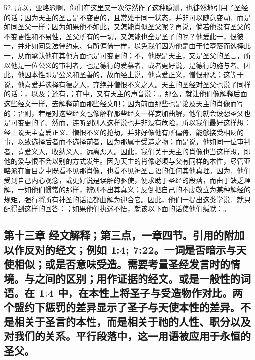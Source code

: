 52. 所以，亚略派啊，你们在这里又一次徒然作了这种臆测，也徒然地引用了圣经的话；因为天主的圣言是不变更的，且常处于同一状态，并非可以随意变动，而是如同圣父一样；因为如果他不如此，又怎能肖似圣父呢？再说，倘若他没有圣父的不变更性和不易性，圣父所有的一切，又怎能也全是圣子的呢？他爱此一，恨彼一，并非如同受法律约束、有所偏倚一样，以免我们因为他是由于怕堕落而选择此一，从而承认他在其他方面也是可变更的；不，他既是天主，又是圣父的圣言，所以他是一位公义的审判者，也是德行的爱慕者，或者更好说，是德行的施与者。因此，他因本性即是公义和圣善的，故而经上说，他喜爱正义，憎恨邪恶；这等于说，他喜爱并选择有德之人，弃绝并憎恨不义之人。天主的圣经对圣父也说了同样的话：，以及；还有，；在中，又有天主的声音说：。那么，就让他们像解释后面这些经文一样，去解释前面那些经文吧；因为前面那些也是论及天主的肖像而写的：否则，若是对这些经文也像解释那些经文一样妄加曲解，他们就会设想圣父也是可变更的了。然而，连听到别人这样说也并非没有危险，所以我们最好这样想：经上说天主喜爱正义、憎恨不义的抢劫，并非好像他有所偏倚，能够接受相反的事，以致选择后者而不选择前者，因为那属于受造之物；而是说，他如同一位审判者，喜爱义人，收纳义人，远离恶人。因此，我们关于天主的肖像也当这样想，即他的爱与恨不会以别的方式发生。因为天主的肖像必须与父有同样的本性，尽管亚略派在盲目之中既看不见那肖像，也看不见神圣言语的任何其他真理。因为，他们受到自己内心观念，或更好说是误解的驱使，便求助于圣经的段落，而由于缺乏理解，一如他们惯常的那样，辨别不出其真义；反倒把自己的不虔敬立为某种解经的规矩，强行将所有神圣的话语都曲解为迎合它。因此，他们一提出这类学说，就只配得到这样的回答：；如果他们执迷不悟，就该以下面的话使他们缄默：。\par


\subsection{第十三章 经文解释；第三点，一章四节。引用的附加以作反对的经文；例如  1:4; 7:22。一词是否暗示与天使相似；或是否意味受造。需要考量圣经发言时的情境。与之间的区别；用作证据的经文。或是一般性的词语。在  1:4 中，在本性上将圣子与受造物作对比。两个盟约下惩罚的差异显示了圣子与天使本性的差异。不是相关于圣言的本性，而是相关于祂的人性、职分以及对我们的关系。平行段落中，这一用语被应用于永恒的圣父。}

